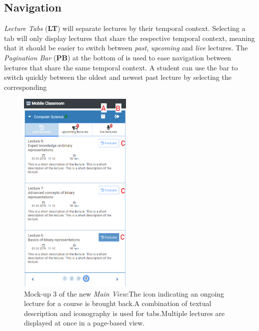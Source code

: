 \subsection{Navigation}
\label{section:con:proposals:mainview:navigation}
\emph{Lecture Tabs} (\textbf{LT}) will separate lectures by their temporal context. Selecting a tab will only display lectures that share the respective temporal context, meaning that it should be easier to switch between \emph{past}, \emph{upcoming} and \emph{live} lectures.
The \emph{Pagination Bar} (\textbf{PB}) at the bottom of  is used to ease navigation between lectures that share the same temporal context. A student can use the bar to switch quickly between the oldest and newest past lecture by selecting the corresponding
\begin{figure}
	\vspace*{-0.5cm}
	\begin{center}
		\includegraphics[width=0.48\textwidth]{mockups/main_view_enhancement_v3.png}
	\end{center}
	\captionsetup{format=plain}
	\caption{Mock-up 3 of the new \emph{Main View}:The icon indicating an ongoing lecture for a course is brought back.A combination of textual description and iconography is used for tabs.Multiple lectures are displayed at once in a page-based view.}
	\label{figure:mainviewenhancement3}
	\vspace*{-0.5cm}

\end{figure}

